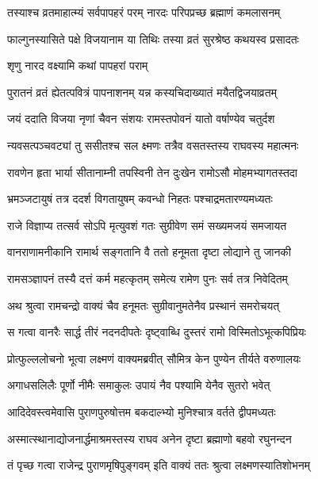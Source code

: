 \twolineshloka
{तस्याश्च व्रतमाहात्म्यं सर्वपापहरं परम्}
{नारदः परिपप्रच्छ ब्रह्माणं कमलासनम्} %

\twolineshloka
{फाल्गुनस्यासिते पक्षे विजयानाम या तिथिः}
{तस्या व्रतं सुरश्रेष्ठ कथयस्व प्रसादतः} %



\onelineshloka
{शृणु नारद वक्ष्यामि कथां पापहरां पराम्} %

\twolineshloka
{पुरातनं व्रतं ह्येतत्पवित्रं पापनाशनम्}
{यन्न कस्यचिदाख्यातं मयैतद्विजयाव्रतम्} %

\twolineshloka
{जयं ददाति विजया नृणां चैवन संशयः}
{रामस्तपोवनं यातो वर्षाण्येव चतुर्दश} %

\twolineshloka
{न्यवसत्पञ्चवट्यां तु ससीतश्च सल क्ष्मणः}
{तत्रैव वसतस्तस्य राघवस्य महात्मनः} %

\twolineshloka
{रावणेन हृता भार्या सीतानाम्नी तपस्विनी}
{तेन दुःखेन रामोऽसौ मोहमभ्यागतस्तदा} %

\twolineshloka
{भ्रमञ्जटायुषं तत्र ददर्श विगतायुषम्}
{कवन्धो निहतः पश्चाद्रमतारण्यमध्यतः} %

\twolineshloka
{राजे विज्ञाप्य तत्सर्व सोऽपि मृत्युवशं गतः}
{सुग्रीवेण समं सख्यमजयं समजायत} %

\twolineshloka
{वानराणामनीकानि रामार्थ सङ्गतानि वै}
{ततो हनूमता दृष्टा लोद्याने तु जानकी} %

\twolineshloka
{रामसञ्ज्ञापनं तस्यै दत्तं कर्म महत्कृतम्}
{समेत्य रामेण पुनः सर्व तत्र निवेदितम्} %

\twolineshloka
{अथ श्रुत्वा रामचन्द्रो वाक्यं चैव हनूमतः}
{सुग्रीवानुमतेनैव प्रस्थानं समरोचयत्} %

\twolineshloka
{स गत्वा वानरैः सार्द्ध तीरं नदनदीपतेः}
{दृष्ट्वाब्धि दुस्तरं रामो विस्मितोऽभूत्कपिप्रियः} %

\twolineshloka
{प्रोत्फुल्ललोचनो भूत्वा लक्ष्मणं वाक्यमब्रवीत्}
{सौमित्र केन पुण्येन तीर्यते वरुणालयः} %

\twolineshloka
{अगाधसलिलैः पूर्णो नीमैः समाकुलः}
{उपायं नैव पश्यामि येनैव सुतरो भवेत्} %


\twolineshloka
{आदिदेवस्त्वमेवासि पुराणपुरुषोत्तम}
{बकदाल्भ्यो मुनिश्चात्र वर्तते द्वीपमध्यतः} %

\twolineshloka
{अस्मात्स्थानाद्योजनार्द्धमाश्रमस्तस्य राघव}
{अनेन दृष्टा ब्रह्माणो बहवो रघुनन्दन} %

\twolineshloka
{तं पृच्छ गत्वा राजेन्द्र पुराणमृषिपुङ्गवम्}
{इति वाक्यं ततः श्रुत्वा लक्ष्मणस्यातिशोभनम्} %


